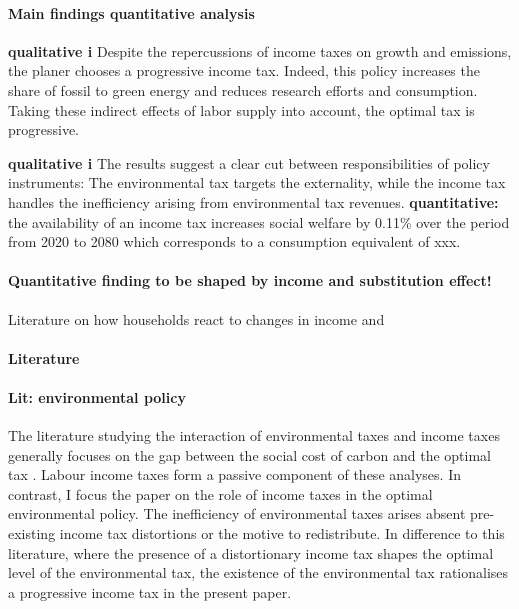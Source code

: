 \paragraph{Main findings quantitative analysis}
\textbf{qualitative i}
Despite the repercussions of income taxes on growth and emissions, the planer chooses a progressive income tax. 
Indeed, this policy increases the share of fossil to green energy and reduces research efforts and consumption. Taking these indirect effects of labor supply into account, the optimal tax is progressive. 

\textbf{qualitative i}
The results suggest a clear cut between responsibilities of policy instruments: The environmental tax targets the externality, while the income tax handles the inefficiency arising from environmental tax revenues.
\textbf{quantitative:} the availability of an income tax increases social welfare by 0.11\% over the period from 2020 to 2080 which corresponds to a consumption equivalent of xxx. 

\paragraph{Quantitative finding to be shaped by income and substitution effect!}
Literature on how households react to changes in income \cite{Bick2018HowImplications} and \cite{Boppart2019LaborPerspectiveb}


\paragraph{Literature}
\paragraph{Lit: environmental policy}
The literature studying the interaction of environmental taxes and income taxes generally focuses on the gap between the social cost of carbon and the optimal tax \citep{Bovenberg1997EnvironmentalGrowth,  Kaplow2012OPTIMALTAXATION, Jacobs2019RedistributionCurves, Barrage2019OptimalPolicy}. Labour income taxes form a passive component of these analyses. 
In contrast, I focus the paper on the role of income taxes in the optimal environmental policy. The inefficiency of environmental taxes arises absent pre-existing income tax distortions or the motive to redistribute.
In difference to this literature, where the presence of a distortionary income tax shapes the optimal level of the environmental tax, the existence of the environmental tax rationalises a progressive income tax in the present paper.

